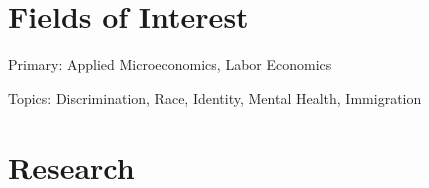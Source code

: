 \documentclass[10pt,letterpaper]{article}
\begin{document}


\section*{Fields of Interest}

Primary: Applied Microeconomics, Labor Economics

Topics: Discrimination, Race, Identity, Mental Health, Immigration

\section*{Research}
%
\end{document}
